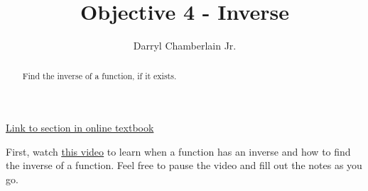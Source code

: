 \documentclass{ximera}
\author{Darryl Chamberlain Jr.}
\title{Objective 4 - Inverse}
\begin{document}
\begin{abstract}
Find the inverse of a function, if it exists.
\end{abstract}
\maketitle
 
\href{https://cnx.org/contents/mwjClAV_@8.1:9ZKq0BnY@15/Inverse-Functions}{Link to section in online textbook}
 
 
First, watch
\underline{\href{https://mediasite.video.ufl.edu/Mediasite/Play/b9f8a4e77dc54b7ba6592d429c10b4911d}{this video}} to learn when a function has an inverse and how to find the inverse of a function.
Feel free to pause the video and fill out the notes as you go.
 
 
\end{document}
